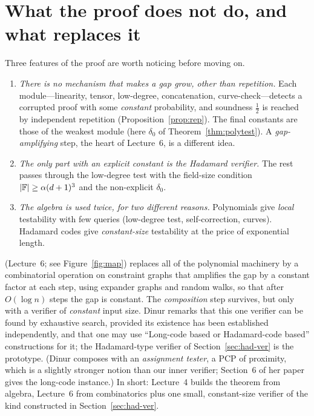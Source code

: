 \section{What the proof does not do, and what replaces it}
\label{sec:alm-limits}

Three features of the proof are worth noticing before moving on.

\begin{enumerate}
  \item \emph{There is no mechanism that makes a gap grow, other than repetition.}  Each module---linearity, tensor, low-degree, concatenation, curve-check---detects a corrupted proof with some \emph{constant} probability, and soundness $\tfrac12$ is reached by independent repetition (Proposition~\ref{prop:rep}).  The final constants are those of the weakest module (here $\delta_0$ of Theorem~\ref{thm:polytest}).  A \emph{gap-amplifying} step, the heart of Lecture~6, is a different idea.
  \item \emph{The only part with an explicit constant is the Hadamard verifier.}  The rest passes through the low-degree test with the field-size condition $|\mathbb{F}|\ge\alpha(d+1)^3$ and the non-explicit $\delta_0$.
  \item \emph{The algebra is used twice, for two different reasons.}  Polynomials give \emph{local} testability with few queries (low-degree test, self-correction, curves).  Hadamard codes give \emph{constant-size} testability at the price of exponential length.
\end{enumerate}

\citet{Dinur07} (Lecture~6; see Figure~\ref{fig:map}) replaces all of the polynomial machinery by a combinatorial operation on constraint graphs that amplifies the gap by a constant factor at each step, using expander graphs and random walks, so that after $O(\log n)$ steps the gap is constant.
The \emph{composition} step survives, but only with a verifier of \emph{constant} input size.  Dinur remarks that this one verifier can be found by exhaustive search, provided its existence has been established independently,
and that one may use ``Long-code based or Hadamard-code based'' constructions for it; the Hadamard-type verifier of Section~\ref{sec:had-ver} is the prototype.  (Dinur composes with an \emph{assignment tester}, \ie a PCP of proximity, which is a slightly stronger notion than our inner verifier; Section~6 of her paper gives the long-code instance.)
In short: Lecture~4 builds the theorem from algebra, Lecture~6 from combinatorics plus one small, constant-size verifier of the kind constructed in Section~\ref{sec:had-ver}.



